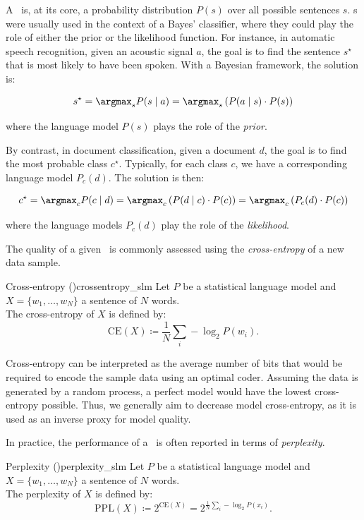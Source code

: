 A \slm\ is, at its core, a probability distribution $P(s)$ over all possible sentences $s$. \slm s were usually used in the context of a Bayes' classifier, where they could play the role of either the prior or the likelihood function. For instance, in automatic speech recognition, given an acoustic signal $a$, the goal is to find the sentence $s^\star$ that is most likely to have been spoken. With a Bayesian framework, the solution is:

\[ s^\star = \argmax_s P(s \mid a) = \argmax_s \left( P(a \mid s) \cdot P(s) \right) \]

where the language model $P(s)$ plays the role of the \emph{prior}.

By contrast, in document classification, given a document $d$, the goal is to find the most probable class $c^\star$. Typically, for each class $c$, we have a corresponding language model $P_c(d)$. The solution is then:

\[ c^\star = \argmax_c P(c \mid d) = \argmax_c \left( P(d \mid c) \cdot P(c) \right) = \argmax_c \left( P_c(d) \cdot P(c) \right) \]

where the language models $P_c(d)$ play the role of the \emph{likelihood}.

The quality of a given \slm\ is commonly assessed using the \emph{cross-entropy} of a new data sample.

\begin{defi}{Cross-entropy (\slm)}{crossentropy_slm}
    Let $P$ be a statistical language model and $X = \{ w_1, \dots, w_N \}$ a sentence of $N$ words.\\
    The cross-entropy of $X$ is defined by:
    \[ \mathrm{CE}(X) \coloneqq \frac{1}{N} \sum_i - \log_2 P(w_i) . \]
\end{defi}

Cross-entropy can be interpreted as the average number of bits that would be required to encode the sample data using an optimal coder. Assuming the data is generated by a random process, a perfect model would have the lowest cross-entropy possible. Thus, we generally aim to decrease model cross-entropy, as it is used as an inverse proxy for model quality.

In practice, the performance of a \slm\ is often reported in terms of \emph{perplexity}.

\begin{defi}{Perplexity (\slm)}{perplexity_slm}
    Let $P$ be a statistical language model and $X = \{ w_1, \dots, w_N \}$ a sentence of $N$ words.\\
    The perplexity of $X$ is defined by:
    \[ \mathrm{PPL}(X) \coloneqq 2^{\mathrm{CE}(X)} = 2^{\frac{1}{N}\sum_i - \log_2 P(x_i)} . \]
\end{defi}

